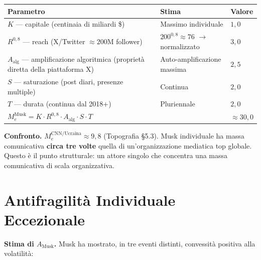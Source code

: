 {\def\LTcaptype{none} %
{\small\begin{longtable}[]{@{}
  >{\raggedright\arraybackslash}p{}
  >{\raggedright\arraybackslash}p{}
  >{\raggedright\arraybackslash}p{}@{}}
\toprule\noalign{}
\begin{minipage}[b]{\linewidth}\raggedright
Parametro
\end{minipage} & \begin{minipage}[b]{\linewidth}\raggedright
Stima
\end{minipage} & \begin{minipage}[b]{\linewidth}\raggedright
Valore
\end{minipage} \\
\midrule\noalign{}
\endhead
\bottomrule\noalign{}
\endlastfoot
\(K\) --- capitale (centinaia di miliardi \$) & Massimo individuale &
\(1{,}0\) \\
\(R^{0{,}8}\) --- reach (X/Twitter \(\approx 200\)M follower) &
\(200^{0{,}8} \approx 76\) $\to$ normalizzato & \(3{,}0\) \\
\(A_{\text{alg}}\) --- amplificazione algoritmica (proprietà diretta
della piattaforma X) & Auto-amplificazione massima & \(2{,}5\) \\
\(S\) --- saturazione (post diari, presenze multiple) & Continua &
\(2{,}0\) \\
\(T\) --- durata (continua dal 2018+) & Pluriennale & \(2{,}0\) \\
\textbf{\(M_e^{\text{Musk}} = K \cdot R^{0{,}8} \cdot A_{\text{alg}} \cdot S \cdot T\)}
& & \textbf{\(\approx 30{,}0\)} \\
\end{longtable}}
}

\Hypoth{} \textbf{Confronto.} \(M_e^{\text{CNN/Ucraina}} \approx 9{,}8\)
(Topografia \S{}5.3). Musk individuale ha massa comunicativa \textbf{circa
tre volte} quella di un'organizzazione mediatica top globale. Questo è
il punto strutturale: un attore singolo che concentra una massa
comunicativa di scala organizzativa.



\section{Antifragilità Individuale
Eccezionale}\label{antifragilituxe0-individuale-eccezionale}

\Hypoth{} \textbf{Stima di \(A_{\text{Musk}}\).} Musk ha mostrato, in
tre eventi distinti, convessità positiva alla volatilità:

